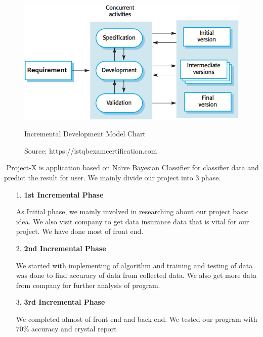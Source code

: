 \begin{figure}[tbh] %
\begin{center}
	\includegraphics[width = 5in]{images/sdlc.png}
	\caption{Incremental Development Model Chart} %
	\caption*{Source: https://istqbexamcertification.com}
	\label{Incremental Development Model Chart} %
\end{center}
\end{figure}
\par 
$  $
Project-X is application based on Na\"{\i}ve Bayesian Classifier for classifier data and predict the result for user.
We mainly divide our project into 3 phase.
\begin{enumerate}
	\item[1.] \textbf{1st Incremental Phase}
	\par
	As Initial phase, we mainly involved in researching about our project basic idea. We also visit company to get data insurance data that is vital for  our project. We have done most of front end. 
	 \item[2.] \textbf{2nd Incremental Phase}
	 \par 
	 We started with implementing of algorithm and training and testing of data was done to find accuracy of data from collected data. We also get more data from company for further analysis of program.
	 \newpage
	 \item[3.] \textbf{3rd Incremental Phase}
	 \par 
	 We completed almost of front end and back end. We tested our program with 70\% accuracy and crystal report %
\end{enumerate}







